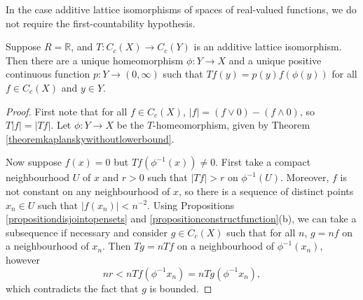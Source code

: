 
In the case additive lattice isomorphisms of spaces of real-valued functions, we do not require the first-countability hypothesis.

\begin{theorem}\label{theoremadditivekaplansky}
Suppose $R=\mathbb{R}$, and $T:C_c(X)\to C_c(Y)$ is an additive lattice isomorphism. Then there are a unique homeomorphism $\phi:Y\to X$ and a unique positive continuous function $p:Y\to (0,\infty)$ such that $Tf(y)=p(y)f(\phi(y))$ for all $f\in C_c(X)$ and $y\in Y$.
\end{theorem}
\begin{proof}

First note that for all $f\in C_c(X)$, $|f|=(f\lor 0)-(f\land 0)$, so $T|f|=|Tf|$. Let $\phi:Y\to X$ be the $T$-homeomorphism, given by Theorem \ref{theoremkaplanskywithoutlowerbound}.

Now suppose $f(x)=0$ but $Tf(\phi^{-1}(x))\neq 0$. First take a compact neighbourhood $U$ of $x$ and $r>0$ such that $|Tf|>r$ on $\phi^{-1}(U)$. Moreover, $f$ is not constant on any neighbourhood of $x$, so there is a sequence of distinct points $x_n\in U$ such that $|f(x_n)|<n^{-2}$. 
 Using Propositions \ref{propositiondisjointopensets} and \ref{propositionconstructfunction}(b), we can take a subsequence if necessary and consider $g\in C_c(X)$ such that for all $n$, $g=nf$ on a neighbourhood of $x_n$. Then $Tg=nTf$ on a neighbourhood of $\phi^{-1}(x_n)$, however
 \[nr<nTf(\phi^{-1}x_n)=nTg(\phi^{-1}x_n),\]
 which contradicts the fact that $g$ is bounded.



\end{proof}
